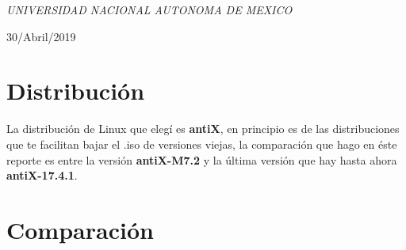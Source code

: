 \documentclass[a4paper, 11pt, oneside]{article}
\begin{document}
\begin{titlepage}
	\textit{UNIVERSIDAD NACIONAL AUTONOMA DE MEXICO} 
	
	
	
	
	
	\vspace{0.3\baselineskip} 
	
	30/Abril/2019 
	
	 

\end{titlepage}

\section*{Distribución}
La distribución de Linux que elegí es \textbf{antiX}, en principio es de las distribuciones que te facilitan bajar el .iso de versiones viejas, la comparación que hago en éste reporte es entre la versión \textbf{antiX-M7.2} y la última versión que hay hasta ahora \textbf{antiX-17.4.1}.

\section*{Comparación}
\end{document}
